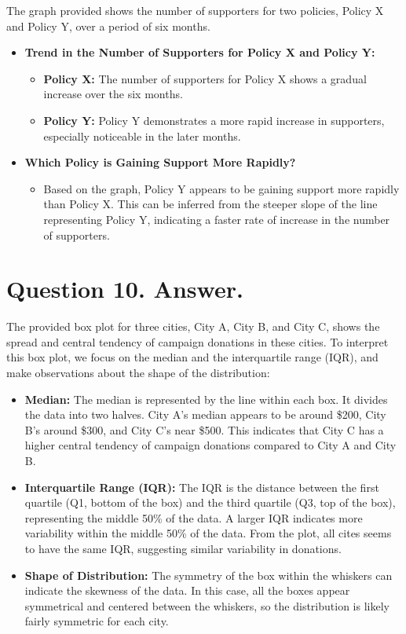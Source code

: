 \documentclass{article}
\begin{document}
The graph provided shows the number of supporters for two policies, Policy X and Policy Y, over a period of six months.

\begin{itemize}
    \item \textbf{Trend in the Number of Supporters for Policy X and Policy Y:}
    \begin{itemize}
        \item \textbf{Policy X:} The number of supporters for Policy X shows a gradual increase over the six months.
        \item \textbf{Policy Y:} Policy Y demonstrates a more rapid increase in supporters, especially noticeable in the later months.
    \end{itemize}
    \item \textbf{Which Policy is Gaining Support More Rapidly?}
    \begin{itemize}
        \item Based on the graph, Policy Y appears to be gaining support more rapidly than Policy X. This can be inferred from the steeper slope of the line representing Policy Y, indicating a faster rate of increase in the number of supporters.
    \end{itemize}
\end{itemize}


\section*{Question 10. Answer.}

The provided box plot for three cities, City A, City B, and City C, shows the spread and central tendency of campaign donations in these cities. To interpret this box plot, we focus on the median and the interquartile range (IQR), and make observations about the shape of the distribution:

\begin{itemize}
    \item \textbf{Median:} The median is represented by the line within each box. It divides the data into two halves. City A's median appears to be around \$200, City B's around \$300, and City C's near \$500. This indicates that City C has a higher central tendency of campaign donations compared to City A and City B.
    \item \textbf{Interquartile Range (IQR):} The IQR is the distance between the first quartile (Q1, bottom of the box) and the third quartile (Q3, top of the box), representing the middle 50\% of the data. A larger IQR indicates more variability within the middle 50\% of the data. From the plot, all cites seems to have the same IQR, suggesting similar variability in donations.
    \item \textbf{Shape of Distribution:} The symmetry of the box within the whiskers can indicate the skewness of the data. In this case, all the boxes appear symmetrical and centered between the whiskers, so the distribution is likely fairly symmetric for each city.
\end{itemize}
\end{document}
